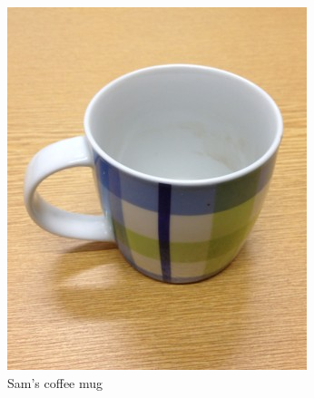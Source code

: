 \documentclass[12pt,final,twoside]{report}
\theoremstyle{plain}
\theoremstyle{definition}
\theoremstyle{remark}
\begin{document}
\iffalse
\begin{figure}[tbhp]
  \centering
  \begin{subfigure}[b]{.3\textwidth}
    \includegraphics[width=\textwidth]{themug}
    \caption{Sam's coffee mug}
  \end{subfigure}
  ~
  \begin{subfigure}[b]{.3\textwidth}
    \centering

\end{subfigure}
\end{figure}
\end{document}
